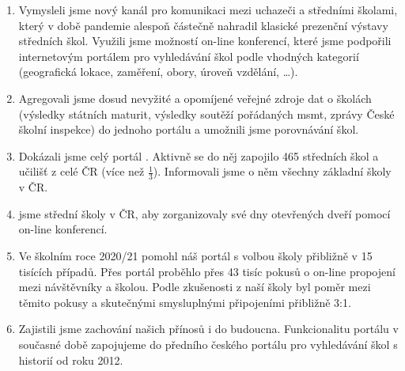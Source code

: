 \begin{enumerate}
  \item Vymysleli jsme nový kanál pro komunikaci mezi uchazeči a středními školami, který v době pandemie alespoň částečně nahradil klasické prezenční výstavy středních škol.
    Využili jsme možností on-line konferencí, které jsme podpořili internetovým portálem pro vyhledávání škol podle vhodných kategorií (geografická lokace, zaměření, obory, úroveň vzdělání, \ldots).

  \item Agregovali jsme dosud nevyžité a opomíjené veřejné zdroje dat o školách (výsledky státních maturit, výsledky soutěží pořádaných \acrshort{msmt}, zprávy České školní inspekce)
    do  jednoho portálu a umožnili jsme porovnávání škol.

  \item Dokázali jsme celý portál . Aktivně se do něj zapojilo 465 středních škol a učilišť z celé ČR (více než \(\frac{1}{3}\)).
    Informovali jsme o něm všechny základní školy v ČR.

  \item {} jsme střední školy v ČR, aby zorganizovaly své dny otevřených dveří pomocí on-line konferencí.
  \item Ve školním roce 2020/21 pomohl náš portál s volbou školy přibližně v 15 tisících případů. 
    Přes portál proběhlo přes 43 tisíc pokusů o on-line propojení mezi návštěvníky a školou.
    Podle zkušenosti z naší školy byl poměr mezi těmito pokusy a skutečnými smysluplnými připojeními přibližně 3:1. 

  \item Zajistili jsme zachování našich přínosů i do budoucna. Funkcionalitu portálu v současné době zapojujeme do předního českého portálu pro vyhledávání škol s historií od roku 2012.
\end{enumerate}


